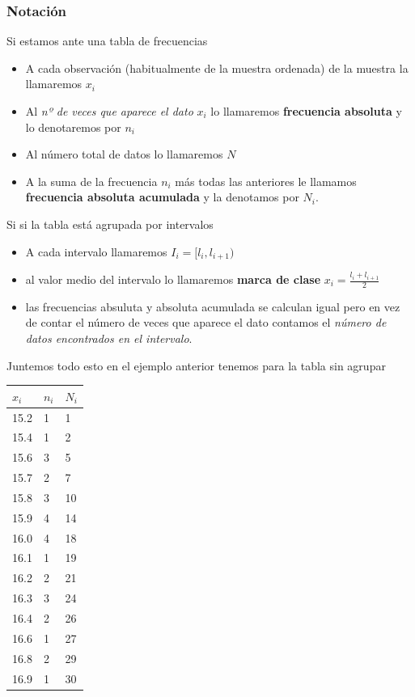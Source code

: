 \documentclass[
]{article}
\providecommand{\tightlist}{%
  \setlength{\itemsep}{0pt}\setlength{\parskip}{0pt}}
\begin{document}
\hypertarget{notaciuxf3n}{%
\subsubsection{Notación}\label{notaciuxf3n}}

Si estamos ante una tabla de frecuencias

\begin{itemize}
\tightlist
\item
  A cada observación (habitualmente de la muestra ordenada) de la
  muestra la llamaremos \(x_i\)
\item
  Al \emph{nº de veces que aparece el dato} \(x_i\) lo llamaremos
  \textbf{frecuencia absoluta} y lo denotaremos por \(n_i\)
\item
  Al número total de datos lo llamaremos \(N\)
\item
  A la suma de la frecuencia \(n_i\) más todas las anteriores le
  llamamos \textbf{frecuencia absoluta acumulada} y la denotamos por
  \(N_i\).
\end{itemize}

Si si la tabla está agrupada por intervalos

\begin{itemize}
\tightlist
\item
  A cada intervalo llamaremos \(I_i = [l_i, l_{i+1})\)
\item
  al valor medio del intervalo lo llamaremos \textbf{marca de clase}
  \(x_i = \frac{l_i+ l_{i+1}}{2}\)
\item
  las frecuencias absuluta y absoluta acumulada se calculan igual pero
  en vez de contar el número de veces que aparece el dato contamos el
  \emph{número de datos encontrados en el intervalo}.
\end{itemize}

Juntemos todo esto en el ejemplo anterior tenemos para la tabla sin
agrupar

\begin{longtable}[]{@{}lll@{}}
\toprule
\(x_i\) & \(n_i\) & \(N_i\)\tabularnewline
\midrule
\endhead
15.2 & 1 & 1\tabularnewline
15.4 & 1 & 2\tabularnewline
15.6 & 3 & 5\tabularnewline
15.7 & 2 & 7\tabularnewline
15.8 & 3 & 10\tabularnewline
15.9 & 4 & 14\tabularnewline
16.0 & 4 & 18\tabularnewline
16.1 & 1 & 19\tabularnewline
16.2 & 2 & 21\tabularnewline
16.3 & 3 & 24\tabularnewline
16.4 & 2 & 26\tabularnewline
16.6 & 1 & 27\tabularnewline
16.8 & 2 & 29\tabularnewline
16.9 & 1 & 30\tabularnewline
\bottomrule
\end{longtable}
\end{document}
